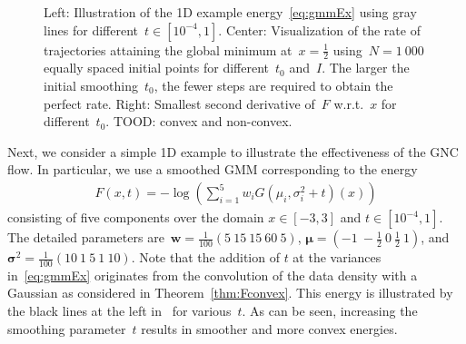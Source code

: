 \documentclass{article}
\theoremstyle{plain}
\theoremstyle{definition}
\theoremstyle{remark}
\begin{document}
\begin{figure}[th]
\centering
{}
\label{fig:gmmOptimization}
\caption{Left: Illustration of the 1D example energy~\eqref{eq:gmmEx} using gray lines for different~$t\in[10^{-4},1]$.
Center: Visualization of the rate of trajectories attaining the global minimum at~$x=\frac{1}{2}$ using~$N=1\ 000$ equally spaced initial points for different~$t_0$ and~$I$.
The larger the initial smoothing~$t_0$, the fewer steps are required to obtain the perfect rate.
Right: Smallest second derivative of~$F$ w.r.t.~$x$ for different~$t_0$. TOOD: convex and non-convex.
}
\end{figure}
Next, we consider a simple 1D example to illustrate the effectiveness of the GNC flow.
In particular, we use a smoothed GMM corresponding to the energy
\begin{align} \label{eq:gmmEx}
F(x,t)=-\log\left(\sum_{i=1}^5 w_i G\left(\mu_i,\sigma_i^2+t\right)(x)\right)
\end{align}
consisting of five components over the domain $x\in[-3,3]$ and $t\in[10^{-4},1]$.
The detailed parameters are~$\bm{w}=\tfrac{1}{100}(5\ 15\ 15\ 60\ 5)$, $\bm{\mu}=(-1\ -\tfrac12\ 0\ \tfrac12\ 1)$, and $\bm{\sigma}^2=\tfrac{1}{100}(10\ 1\ 5\ 1\ 10)$.
Note that the addition of $t$ at the variances in~\eqref{eq:gmmEx} originates from the convolution of the data density with a Gaussian as considered in Theorem~\ref{thm:Fconvex}.
This energy is illustrated by the black lines at the left in~ for various~$t$.
As can be seen, increasing the smoothing parameter~$t$ results in smoother and more convex energies.
\end{document}
